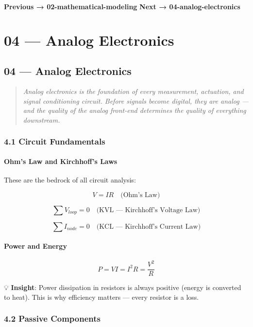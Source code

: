 \documentclass[11pt,a4paper]{book}
\begin{document}
\medskip\noindent\hrulefill\medskip

\textbf{Previous → 02-mathematical-modeling}  
\textbf{Next → 04-analog-electronics}


\chapter{04 — Analog Electronics}
\section{04 — Analog Electronics}

\begin{quote}
\textit{Analog electronics is the foundation of every measurement, actuation, and signal conditioning circuit. Before signals become digital, they are analog — and the quality of the analog front-end determines the quality of everything downstream.}
\end{quote}

\medskip\noindent\hrulefill\medskip

\subsection{4.1 Circuit Fundamentals}

\subsubsection{Ohm's Law and Kirchhoff's Laws}

These are the bedrock of all circuit analysis:

\[V = IR \quad \text{(Ohm's Law)}\]

\[\sum V_{loop} = 0 \quad \text{(KVL — Kirchhoff's Voltage Law)}\]

\[\sum I_{node} = 0 \quad \text{(KCL — Kirchhoff's Current Law)}\]

\subsubsection{Power and Energy}

\[P = VI = I^2R = \frac{V^2}{R}\]

💡 \textbf{Insight}: Power dissipation in resistors is always positive (energy is converted to heat). This is why efficiency matters — every resistor is a loss.

\medskip\noindent\hrulefill\medskip

\subsection{4.2 Passive Components}
\end{document}
